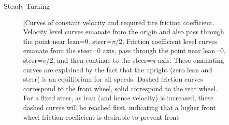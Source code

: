 \documentclass[final]{beamer}
\newlength{\onecolwid}
\begin{document}
{\begin{center}
\begin{columns}[t]
\begin{column}{\onecolwid}
\begin{block}{Steady Turning}
{    \begin{figure}[h]
      \begin{center}

        \quad
        \subfloat[Curves of constant velocity and required tire friction
        coefficient. Velocity level curves emanate from the origin and also
        pass through the point near lean=0, steer=$\pi$/2. Friction
        coefficient level curves emanate from the steer=0 axis, pass through
        the point near lean=0, steer=$\pi$/2, and then continue to the
        steer=$\pi$ axis. These emanating curves are explained by the fact that
        the upright (zero lean and steer) is an equilibrium for all speeds.
        Dashed friction curves correspond to the front wheel, solid correspond
        to the rear wheel. For a fixed steer, as lean (and hence velocity) is
        increased, these dashed curves will be reached first, indicating that a
        higher front wheel friction coefficient is desirable to prevent front

\end{center}
\end{figure}}
\end{block}
\end{column}
\end{columns}
\end{center}}
\end{document}
